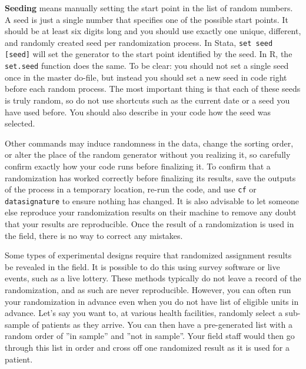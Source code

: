 \textbf{Seeding} means manually setting the start point in the list of random numbers.
A seed is just a single number that specifies one of the possible start points.
It should be at least six digits long and you should use exactly
one unique, different, and randomly created seed per randomization process.
In Stata, \texttt{set seed [seed]} will set the generator
to the start point identified by the seed.
In R, the \texttt{set.seed} function does the same.
To be clear: you should not set a single seed once in the master do-file,
but instead you should set a new seed in code right before each random process.
The most important thing is that each of these seeds is truly random,
so do not use shortcuts such as the current date or a seed you have used before.
You should also describe in your code how the seed was selected.

Other commands may induce randomness in the data,
change the sorting order,
or alter the place of the random generator without you realizing it,
so carefully confirm exactly how your code runs before finalizing it.
To confirm that a randomization has worked correctly before finalizing its results,
save the outputs of the process in a temporary location,
re-run the code, and use \texttt{cf} or \texttt{datasignature} to ensure
nothing has changed. It is also advisable to let someone else reproduce your
randomization results on their machine to remove any doubt that your results
are reproducible.
Once the result of a randomization is used in the field,
there is no way to correct any mistakes.


Some types of experimental designs require
that randomized assignment results be revealed in the field.
It is possible to do this using survey software or live events, such as a live lottery.
These methods typically do not leave a record of the randomization,
and as such are never reproducible.
However, you can often run your randomization in advance
even when you do not have list of eligible units in advance.
Let's say you want to, at various health facilities,
randomly select a sub-sample of patients as they arrive.
You can then have a pre-generated list
with a random order of ''in sample'' and ''not in sample''.
Your field staff would then go through this list in order
and cross off one randomized result as it is used for a patient.

